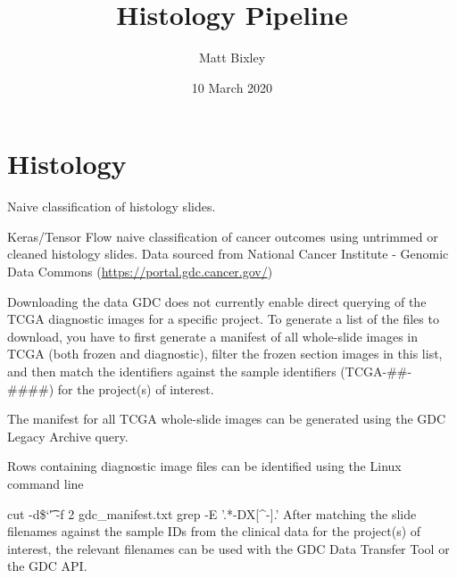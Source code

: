 \documentclass[]{article}
\title{Histology Pipeline}
\author{Matt Bixley}
\date{10 March 2020}
\newenvironment{Shaded}{\begin{snugshade}}{\end{snugshade}}
\newcommand{\FunctionTok}[1]{\textcolor[rgb]{0.00,0.00,0.00}{#1}}
\newcommand{\VariableTok}[1]{\textcolor[rgb]{0.00,0.00,0.00}{#1}}
\newcommand{\NormalTok}[1]{#1}
\begin{document}
\maketitle

\section{Histology}\label{histology}

Naive classification of histology slides.

Keras/Tensor Flow naive classification of cancer outcomes using
untrimmed or cleaned histology slides. Data sourced from National Cancer
Institute - Genomic Data Commons (\url{https://portal.gdc.cancer.gov/})

Downloading the data GDC does not currently enable direct querying of
the TCGA diagnostic images for a specific project. To generate a list of
the files to download, you have to first generate a manifest of all
whole-slide images in TCGA (both frozen and diagnostic), filter the
frozen section images in this list, and then match the identifiers
against the sample identifiers (TCGA-\#\#-\#\#\#\#) for the project(s)
of interest.

The manifest for all TCGA whole-slide images can be generated using the
GDC Legacy Archive query.

Rows containing diagnostic image files can be identified using the Linux
command line

cut -d\$`\t' -f 2 gdc\_manifest.txt \textbar{} grep -E
'.*-DX{[}\^{}-{]}\w*.' After matching the slide filenames against the
sample IDs from the clinical data for the project(s) of interest, the
relevant filenames can be used with the GDC Data Transfer Tool or the
GDC API.

\begin{Shaded}
\end{Shaded}
\end{document}
